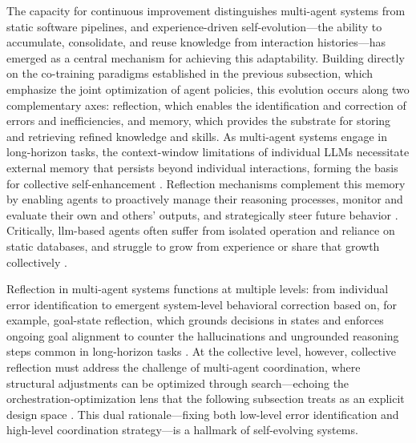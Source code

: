 \documentclass[11pt,a4paper]{article}
\begin{document}
The capacity for continuous improvement distinguishes multi-agent systems from static software pipelines, and experience-driven self-evolution---the ability to accumulate, consolidate, and reuse knowledge from interaction histories---has emerged as a central mechanism for achieving this adaptability. Building directly on the co-training paradigms established in the previous subsection, which emphasize the joint optimization of agent policies, this evolution occurs along two complementary axes: reflection, which enables the identification and correction of errors and inefficiencies, and memory, which provides the substrate for storing and retrieving refined knowledge and skills. As multi-agent systems engage in long-horizon tasks, the context-window limitations of individual LLMs necessitate external memory that persists beyond individual interactions, forming the basis for collective self-enhancement \cite{arxiv:2404.13501v1,arxiv:2603.07670v1}. Reflection mechanisms complement this memory by enabling agents to proactively manage their reasoning processes, monitor and evaluate their own and others' outputs, and strategically steer future behavior \cite{arxiv:2503.09501v3}. Critically, llm-based agents often suffer from isolated operation and reliance on static databases, and struggle to grow from experience or share that growth collectively \cite{arxiv:2404.09982v3}.

Reflection in multi-agent systems functions at multiple levels: from individual error identification to emergent system-level behavioral correction based on, for example, goal-state reflection, which grounds decisions in states and enforces ongoing goal alignment to counter the hallucinations and ungrounded reasoning steps common in long-horizon tasks \cite{arxiv:2505.15182v2}. At the collective level, however, collective reflection must address the challenge of multi-agent coordination, where structural adjustments can be optimized through search---echoing the orchestration-optimization lens that the following subsection treats as an explicit design space \cite{arxiv:2410.06153v3}. This dual rationale---fixing both low-level error identification and high-level coordination strategy---is a hallmark of self-evolving systems.
\end{document}
